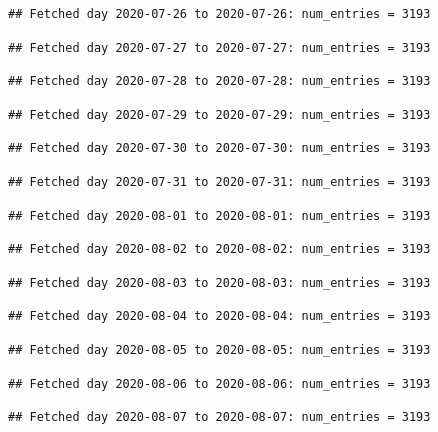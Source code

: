 \documentclass[]{article}
\begin{document}
\begin{verbatim}
## Fetched day 2020-07-26 to 2020-07-26: num_entries = 3193
\end{verbatim}

\begin{verbatim}
## Fetched day 2020-07-27 to 2020-07-27: num_entries = 3193
\end{verbatim}

\begin{verbatim}
## Fetched day 2020-07-28 to 2020-07-28: num_entries = 3193
\end{verbatim}

\begin{verbatim}
## Fetched day 2020-07-29 to 2020-07-29: num_entries = 3193
\end{verbatim}

\begin{verbatim}
## Fetched day 2020-07-30 to 2020-07-30: num_entries = 3193
\end{verbatim}

\begin{verbatim}
## Fetched day 2020-07-31 to 2020-07-31: num_entries = 3193
\end{verbatim}

\begin{verbatim}
## Fetched day 2020-08-01 to 2020-08-01: num_entries = 3193
\end{verbatim}

\begin{verbatim}
## Fetched day 2020-08-02 to 2020-08-02: num_entries = 3193
\end{verbatim}

\begin{verbatim}
## Fetched day 2020-08-03 to 2020-08-03: num_entries = 3193
\end{verbatim}

\begin{verbatim}
## Fetched day 2020-08-04 to 2020-08-04: num_entries = 3193
\end{verbatim}

\begin{verbatim}
## Fetched day 2020-08-05 to 2020-08-05: num_entries = 3193
\end{verbatim}

\begin{verbatim}
## Fetched day 2020-08-06 to 2020-08-06: num_entries = 3193
\end{verbatim}

\begin{verbatim}
## Fetched day 2020-08-07 to 2020-08-07: num_entries = 3193
\end{verbatim}
\end{document}
